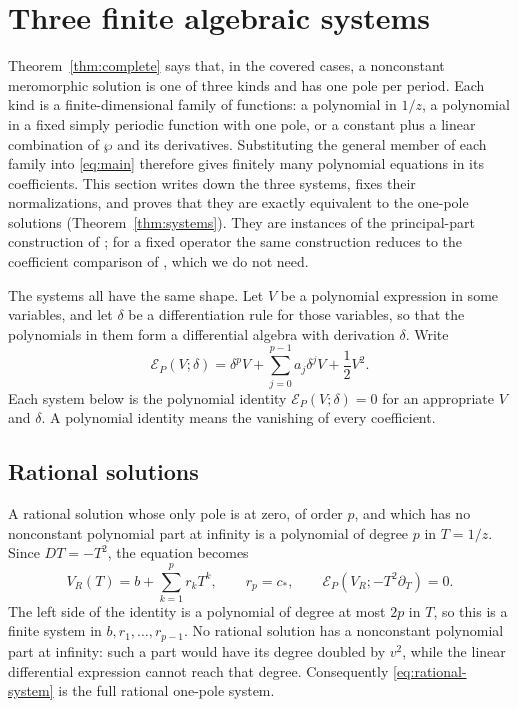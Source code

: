 \section{Three finite algebraic systems}\label{sec:systems}

Theorem~\ref{thm:complete} says that, in the covered cases, a
nonconstant meromorphic solution is one of three kinds and has one
pole per period. Each kind is a finite-dimensional family of
functions: a polynomial in \(1/z\), a polynomial in a fixed simply
periodic function with one pole, or a constant plus a linear
combination of \(\wp\) and its derivatives. Substituting the general
member of each family into \eqref{eq:main} therefore gives finitely
many polynomial equations in its coefficients. This section writes down the three
systems, fixes their normalizations, and proves that they are exactly
equivalent to the one-pole solutions (Theorem~\ref{thm:systems}).
They are instances of the principal-part construction of
\citet{DeminaKudryashov2011,DeminaKudryashovElliptic2011}; for a fixed
operator the same construction reduces to the coefficient comparison of
\citet{DeminaKudryashov2014}, which we do not need.

The systems all have the same shape. Let \(V\) be a polynomial
expression in some variables, and let \(\delta\) be a differentiation
rule for those variables, so that the polynomials in them form a
differential algebra with derivation \(\delta\). Write
\[
 \mathcal E_P(V;\delta)=
 \delta^pV+\sum_{j=0}^{p-1}a_j\delta^jV+\frac12V^2.
\]
Each system below is the polynomial identity
\(\mathcal E_P(V;\delta)=0\) for an appropriate \(V\) and \(\delta\).
A polynomial identity means the vanishing of every coefficient.

\subsection{Rational solutions}

A rational solution whose only pole is at zero, of order \(p\), and
which has no nonconstant polynomial part at infinity is a polynomial
of degree \(p\) in \(T=1/z\). Since \(DT=-T^2\), the equation becomes
\begin{equation}\label{eq:rational-system}
 V_R(T)=b+\sum_{k=1}^{p}r_kT^k,\qquad r_p=c_\ast,\qquad
 \mathcal E_P(V_R;-T^2\partial_T)=0.
\end{equation}
The left side of the identity is a polynomial of degree at most
\(2p\) in \(T\), so this is a finite system in
\(b,r_1,\ldots,r_{p-1}\).
No rational solution has a nonconstant polynomial part at infinity:
such a part would have its degree doubled by \(v^2\), while the
linear differential expression cannot reach that degree.
Consequently \eqref{eq:rational-system} is the full rational
one-pole system.


